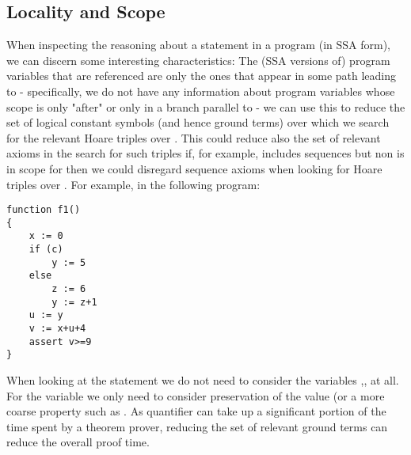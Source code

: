 	
	\subsection{Locality and Scope}
	When inspecting the reasoning about a statement  in a program  (in SSA form), we can discern some interesting characteristics:
		The (SSA versions of) program variables that are referenced are only the ones that appear in some path leading to  - specifically, we do not have any information about program variables whose scope is only "after"  or only in a branch parallel to  - we can use this to reduce the set of logical constant symbols (and hence ground terms) over which we search for the relevant Hoare triples over .
		This could reduce also the set of relevant axioms in the search for such triples if, for example,  includes sequences but non is in scope for  then we could disregard sequence axioms when looking for Hoare triples over .
		For example, in the following program:
\begin{lstlisting}
function f1()
{
	x := 0
	if (c)
		y := 5
	else
		z := 6
		y := z+1
	u := y
	v := x+u+4
	assert v>=9
}
\end{lstlisting}		
	When looking at the statement  we do not need to consider the variables ,,  at all.
	For the variable  we only need to consider preservation of the value (or a more coarse property such as .
	As quantifier can take up a significant portion of the time spent by a theorem prover, reducing the set of relevant ground terms can reduce the overall proof time.
	
